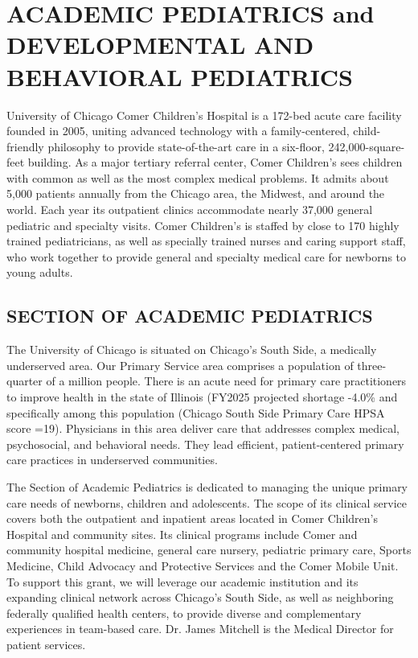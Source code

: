\section*{ACADEMIC PEDIATRICS and
DEVELOPMENTAL AND BEHAVIORAL PEDIATRICS}


University of Chicago Comer Children's Hospital is a 172-bed acute care facility founded in 2005, uniting advanced technology with a family-centered, child-friendly philosophy to provide state-of-the-art care in a six-floor, 242,000-square-feet building. As a major tertiary referral center, Comer Children's sees children with common as well as the most complex medical problems. It admits about 5,000 patients annually from the Chicago area, the Midwest, and around the world. Each year its outpatient clinics accommodate nearly 37,000 general pediatric and specialty visits. Comer Children's is staffed by close to 170 highly trained pediatricians, as well as specially trained nurses and caring support staff, who work together to provide general and specialty medical care for newborns to young adults.

\subsection*{SECTION OF ACADEMIC PEDIATRICS}
The University of Chicago is situated on Chicago’s South Side, a medically underserved area. Our Primary Service area comprises a population of three-quarter of a million people. There is an acute need for primary care practitioners to improve health in the state of Illinois (FY2025 projected shortage -4.0\% and specifically among this population (Chicago South Side Primary Care HPSA score =19). Physicians in this area deliver care that addresses complex medical, psychosocial, and behavioral needs.  They lead efficient, patient-centered primary care practices in underserved communities.

The Section of Academic Pediatrics is dedicated to managing the unique primary care needs of newborns, children and adolescents. The scope of its clinical service covers both the outpatient and inpatient areas located in Comer Children's Hospital and community sites. Its clinical programs include Comer and community hospital medicine, general care nursery, pediatric primary care, Sports Medicine, Child Advocacy and Protective Services and the Comer Mobile Unit.  To support this grant, we will leverage our academic institution and its expanding clinical network across Chicago’s South Side, as well as neighboring federally qualified health centers, to provide diverse and complementary experiences in team-based care. Dr. James Mitchell is the Medical Director for patient services.  

